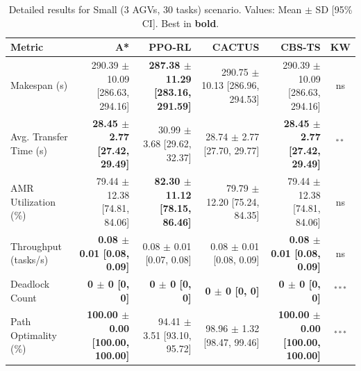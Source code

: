 \documentclass[review]{elsarticle}
\begin{document}
\begin{table}[htbp]
\centering
\caption{Detailed results for Small (3 AGVs, 30 tasks) scenario. Values: Mean $\pm$ SD [95\% CI]. Best in \textbf{bold}.}
\label{tab:detail_s1_small}
\small
\begin{tabular}{@{}lrrrrc@{}}
\toprule
\textbf{Metric} & \textbf{A*} & \textbf{PPO-RL} & \textbf{CACTUS} & \textbf{CBS-TS} & \textbf{KW} \\
\midrule
Makespan (s) & 290.39 $\pm$ 10.09 [286.63, 294.16] & \textbf{287.38 $\pm$ 11.29 [283.16, 291.59]} & 290.75 $\pm$ 10.13 [286.96, 294.53] & 290.39 $\pm$ 10.09 [286.63, 294.16] & ns \\
Avg. Transfer Time (s) & \textbf{28.45 $\pm$ 2.77 [27.42, 29.49]} & 30.99 $\pm$ 3.68 [29.62, 32.37] & 28.74 $\pm$ 2.77 [27.70, 29.77] & \textbf{28.45 $\pm$ 2.77 [27.42, 29.49]} & $^{**}$ \\
AMR Utilization (\%) & 79.44 $\pm$ 12.38 [74.81, 84.06] & \textbf{82.30 $\pm$ 11.12 [78.15, 86.46]} & 79.79 $\pm$ 12.20 [75.24, 84.35] & 79.44 $\pm$ 12.38 [74.81, 84.06] & ns \\
Throughput (tasks/s) & \textbf{0.08 $\pm$ 0.01 [0.08, 0.09]} & 0.08 $\pm$ 0.01 [0.07, 0.08] & 0.08 $\pm$ 0.01 [0.08, 0.09] & \textbf{0.08 $\pm$ 0.01 [0.08, 0.09]} & ns \\
Deadlock Count & \textbf{0 $\pm$ 0 [0, 0]} & \textbf{0 $\pm$ 0 [0, 0]} & \textbf{0 $\pm$ 0 [0, 0]} & \textbf{0 $\pm$ 0 [0, 0]} & $^{***}$ \\
Path Optimality (\%) & \textbf{100.00 $\pm$ 0.00 [100.00, 100.00]} & 94.41 $\pm$ 3.51 [93.10, 95.72] & 98.96 $\pm$ 1.32 [98.47, 99.46] & \textbf{100.00 $\pm$ 0.00 [100.00, 100.00]} & $^{***}$ \\
\bottomrule
\end{tabular}
\end{table}
\end{document}

